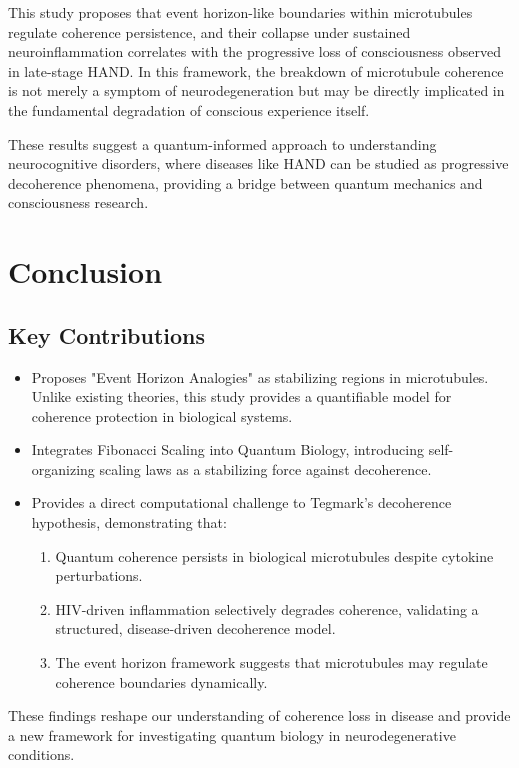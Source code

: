 \documentclass[entropy,article,submit,oneauthor,pdftex]{Definitions/mdpi}
\begin{document}
This study proposes that event horizon-like boundaries within microtubules regulate coherence persistence, and their collapse under sustained neuroinflammation correlates with the progressive loss of consciousness observed in late-stage HAND. In this framework, the breakdown of microtubule coherence is not merely a symptom of neurodegeneration but may be directly implicated in the fundamental degradation of conscious experience itself. 

These results suggest a quantum-informed approach to understanding neurocognitive disorders, where diseases like HAND can be studied as progressive decoherence phenomena, providing a bridge between quantum mechanics and consciousness research.
\section{Conclusion}
\subsection{Key Contributions}
\begin{itemize}
\item Proposes "Event Horizon Analogies" as stabilizing regions in microtubules. Unlike existing theories, this study provides a quantifiable model for coherence protection in biological systems.
 \item Integrates Fibonacci Scaling into Quantum Biology, introducing self-organizing scaling laws as a stabilizing force against decoherence.
\item Provides a direct computational challenge to Tegmark's decoherence hypothesis, demonstrating that:
\begin{enumerate}
\item Quantum coherence persists in biological microtubules despite cytokine perturbations.
\item HIV-driven inflammation selectively degrades coherence, validating a structured, disease-driven decoherence model.
\item The event horizon framework suggests that microtubules may regulate coherence boundaries dynamically.
\end{enumerate}
\end{itemize}

These findings reshape our understanding of coherence loss in disease and provide a new framework for investigating quantum biology in neurodegenerative conditions.
\end{document}
